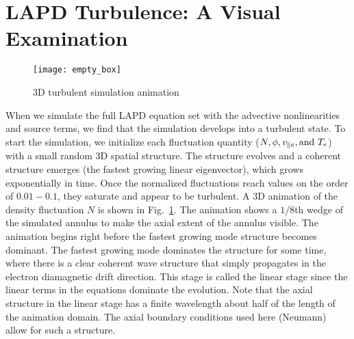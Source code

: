 \section{LAPD Turbulence: A Visual Examination}
\label{s_vis_exam}

\begin{figure}[!ht]
\texttt{[image: empty\_box]}
\centering
\caption{3D turbulent simulation animation}
\label{3D_turb_anim}
\end{figure}


When we simulate the full LAPD equation set with the advective nonlinearities and source terms, we find that the simulation develops into a turbulent state. To start the simulation,
we initialize each fluctuation quantity ($N, \phi, v_{\parallel e}, {\rm and } \ T_e$) with a small random 3D spatial structure. The structure evolves and a coherent structure emerges (the fastest
growing linear eigenvector), which grows exponentially in time. Once the normalized fluctuations reach values on the order of $0.01-0.1$, they saturate and appear to be turbulent.
A 3D animation of the density fluctuation $N$ is shown in Fig.~\ref{3D_turb_anim}. The animation shows a $1/8$th wedge of the simulated annulus to make the axial extent of the annulus visible.
The animation begins right before the fastest growing mode structure becomes dominant. The fastest growing mode dominates the structure for some time, where there is a clear coherent
wave structure that simply propagates in the electron diamagnetic drift direction. This stage is called the linear stage since the linear terms in the equations dominate the evolution.
Note that the axial structure in the linear stage has a finite wavelength about half of the length of the animation domain. The axial boundary conditions used here (Neumann) allow for
such a structure.

